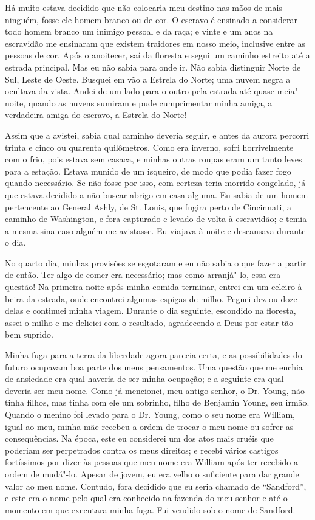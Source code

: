 Há muito estava decidido que não colocaria meu destino nas mãos de mais
ninguém, fosse ele homem branco ou de cor. O escravo é ensinado a
considerar todo homem branco um inimigo pessoal e da raça; e vinte e um
anos na escravidão me ensinaram que existem traidores em nosso meio,
inclusive entre as pessoas de cor. Após o anoitecer, saí da floresta e
segui um caminho estreito até a estrada principal. Mas eu não sabia para
onde ir. Não sabia distinguir Norte de Sul, Leste de Oeste. Busquei em
vão a Estrela do Norte; uma nuvem negra a ocultava da vista. Andei de um
lado para o outro pela estrada até quase meia"-noite, quando as nuvens
sumiram e pude cumprimentar minha amiga, a verdadeira amiga do escravo,
a Estrela do Norte!

Assim que a avistei, sabia qual caminho deveria seguir, e antes da
aurora percorri trinta e cinco ou quarenta quilômetros. Como era
inverno, sofri horrivelmente com o frio, pois estava sem casaca, e
minhas outras roupas eram um tanto leves para a estação. Estava munido
de um isqueiro, de modo que podia fazer fogo quando necessário. Se não
fosse por isso, com certeza teria morrido congelado, já que estava
decidido a não buscar abrigo em casa alguma. Eu sabia de um homem
pertencente ao General Ashly, de St. Louis, que fugira perto de
Cincinnati, a caminho de Washington, e fora capturado e levado de volta
à escravidão; e temia a mesma sina caso alguém me avistasse. Eu viajava
à noite e descansava durante o dia.

No quarto dia, minhas provisões se esgotaram e eu não sabia o que fazer
a partir de então. Ter algo de comer era necessário; mas como
arranjá"-lo, essa era questão! Na primeira noite após minha comida %
terminar, entrei em um celeiro à beira da estrada, onde encontrei
algumas espigas de milho. Peguei dez ou doze delas e continuei minha
viagem. Durante o dia seguinte, escondido na floresta, assei o milho e
me deliciei com o resultado, agradecendo a Deus por estar tão bem
suprido.

Minha fuga para a terra da liberdade agora parecia certa, e as
possibilidades do futuro ocupavam boa parte dos meus pensamentos. Uma
questão que me enchia de ansiedade era qual haveria de ser minha
ocupação; e a seguinte era qual deveria ser meu nome. Como já mencionei,
meu antigo senhor, o Dr. Young, não tinha filhos, mas tinha com ele um
sobrinho, filho de Benjamin Young, seu irmão. Quando o menino foi levado
para o Dr. Young, como o seu nome era William, igual ao meu, minha mãe
recebeu a ordem de trocar o meu nome ou sofrer as consequências. Na
época, este eu considerei um dos atos mais cruéis que poderiam ser
perpetrados contra os meus direitos; e recebi vários castigos
fortíssimos por dizer às pessoas que meu nome era William após ter
recebido a ordem de mudá"-lo. Apesar de jovem, eu era velho o suficiente
para dar grande valor ao meu nome. Contudo, fora decidido que eu seria
chamado de ``Sandford'', e este era o nome pelo qual era conhecido na
fazenda do meu senhor e até o momento em que executara minha fuga. Fui
vendido sob o nome de Sandford.

